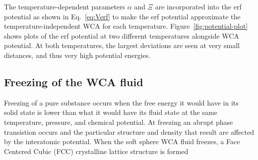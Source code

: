 \documentclass[letterpaper,twocolumn,amsmath,amssymb,prb]{revtex4-1}
\begin{document}
The temperature-dependent parameters $\alpha$ and $\Xi$ are incorporated 
into the erf potential as shown in Eq.~\ref{eq:Verf} to make the 
erf potential approximate the temperature-independent WCA for each temperature.
Figure~\ref{fig:potential-plot} 
shows plots of the erf potential at two different 
temperatures alongside WCA potential. At both temperatures, the largest 
deviations are seen at very small distances,
and thus very high potential energies.
%
%
% 
%
%
%
%
%



\subsection{Freezing of the WCA fluid}

Freezing of a pure substance occurs when the free energy it would have 
in its solid state is lower than what it would have its 
fluid state at the same temperature, pressure, and chemical potential. 
At freezing an abrupt phase transistion occurs and the particular %
structure and density that result are affected by the interatomic potential. 
When the soft sphere WCA fluid freezes, a Face Centered Cubic (FCC) 
crystalline lattice structure is formed~%
\end{document}
